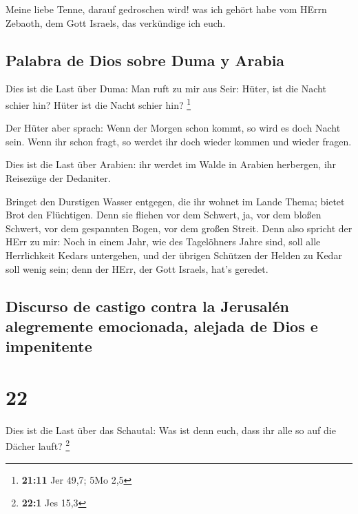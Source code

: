  Meine liebe Tenne, darauf gedroschen wird! was ich
gehört habe vom HErrn Zebaoth, dem Gott Israels, das verkündige ich
euch.

\hypertarget{palabra-de-dios-sobre-duma-y-arabia}{%
\subsection{Palabra de Dios sobre Duma y
Arabia}\label{palabra-de-dios-sobre-duma-y-arabia}}

 Dies ist die Last über Duma: Man ruft zu mir aus Seir:
Hüter, ist die Nacht schier hin? Hüter ist die Nacht schier hin?
\footnote{\textbf{21:11} Jer 49,7; 5Mo 2,5}

 Der Hüter aber sprach: Wenn der Morgen schon kommt, so
wird es doch Nacht sein. Wenn ihr schon fragt, so werdet ihr doch wieder
kommen und wieder fragen.

 Dies ist die Last über Arabien: ihr werdet im Walde in
Arabien herbergen, ihr Reisezüge der Dedaniter.

 Bringet den Durstigen Wasser entgegen, die ihr wohnet im
Lande Thema; bietet Brot den Flüchtigen.  Denn sie
fliehen vor dem Schwert, ja, vor dem bloßen Schwert, vor dem gespannten
Bogen, vor dem großen Streit.  Denn also spricht der HErr
zu mir: Noch in einem Jahr, wie des Tagelöhners Jahre sind, soll alle
Herrlichkeit Kedars untergehen,  und der übrigen Schützen
der Helden zu Kedar soll wenig sein; denn der HErr, der Gott Israels,
hat's geredet.

\hypertarget{discurso-de-castigo-contra-la-jerusaluxe9n-alegremente-emocionada-alejada-de-dios-e-impenitente}{%
\subsection{Discurso de castigo contra la Jerusalén alegremente
emocionada, alejada de Dios e
impenitente}\label{discurso-de-castigo-contra-la-jerusaluxe9n-alegremente-emocionada-alejada-de-dios-e-impenitente}}

\hypertarget{section-21}{%
\section{22}\label{section-21}}

 Dies ist die Last über das Schautal: Was ist denn euch,
dass ihr alle so auf die Dächer lauft? \footnote{\textbf{22:1} Jes 15,3}

